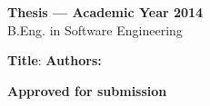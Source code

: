 \thispagestyle{empty}

\begin{flushleft}
\textbf{Thesis --- Academic Year 2014} \\
B.Eng. in Software Engineering \kmitl


\textbf{Title}: 
\textbf{Authors:}

\end{flushleft}

\vfill
\begin{flushright}
\textbf{Approved for submission}
\vspace{1cm}
\vspace{1cm}
 \\
\vspace{1cm}
 \\
\end{flushright}